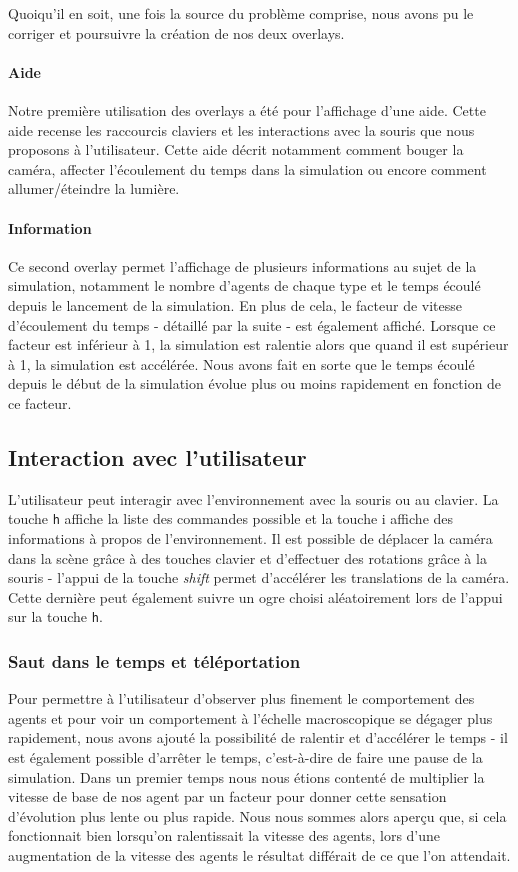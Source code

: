 Quoiqu'il en soit, une fois la source du problème comprise, nous avons pu
le corriger et poursuivre la création de nos deux overlays.

\paragraph{Aide}
Notre première utilisation des overlays a été pour l'affichage d'une aide.
Cette aide recense les raccourcis claviers et les interactions avec la souris
que nous proposons à l'utilisateur. Cette aide décrit notamment comment bouger
la caméra, affecter l'écoulement du temps dans la simulation ou encore comment
allumer/éteindre la lumière.

\paragraph{Information}
Ce second overlay permet l'affichage de plusieurs informations au sujet de la
simulation, notamment le nombre d'agents de chaque type et le temps écoulé
depuis le lancement de la simulation.
En plus de cela, le facteur de vitesse d'écoulement du temps - détaillé par la
suite - est également affiché. Lorsque ce facteur est inférieur à 1, la
simulation est ralentie alors que quand il est supérieur à 1, la simulation
est accélérée. Nous avons fait en sorte que le temps écoulé depuis le début de
la simulation évolue plus ou moins rapidement en fonction de ce facteur.

\subsection{Interaction avec l'utilisateur}

L'utilisateur peut interagir avec l'environnement avec la souris ou au
clavier. La touche \verb!h! affiche la liste des commandes possible et la
touche i affiche des informations à propos de l'environnement.
Il est possible de déplacer la caméra dans la scène grâce à des touches
clavier et d'effectuer des rotations grâce à la souris - l'appui de la touche
\emph{shift} permet d'accélérer les translations de la caméra.
Cette dernière peut également suivre un ogre choisi aléatoirement lors de
l'appui sur la touche \verb!h!.

\subsubsection{Saut dans le temps et téléportation}
Pour permettre à l'utilisateur d'observer plus finement le comportement des
agents et pour voir un comportement à l'échelle macroscopique se dégager plus
rapidement, nous avons ajouté la possibilité de ralentir et d'accélérer le
temps - il est également possible d'arrêter le temps, c'est-à-dire de faire
une pause de la simulation. Dans un premier temps nous nous étions contenté de
multiplier la vitesse de base de nos agent par un facteur pour donner cette
sensation d'évolution plus lente ou plus rapide. Nous nous sommes alors aperçu
que, si cela fonctionnait bien lorsqu'on ralentissait la vitesse des agents,
lors d'une augmentation de la vitesse des agents le résultat différait de ce
que l'on attendait.

